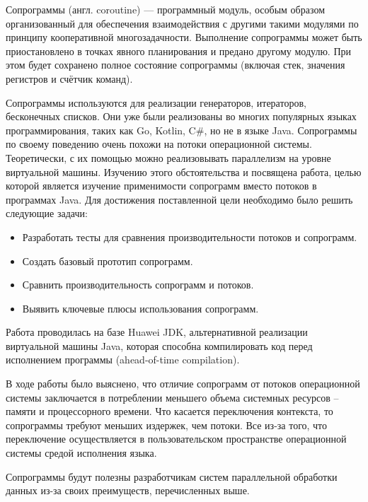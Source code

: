 
Сопрограммы (англ. coroutine) — программный модуль, особым образом организованный для
обеспечения взаимодействия с другими такими модулями по принципу кооперативной
многозадачности. Выполнение сопрограммы может быть
приостановлено в точках явного планирования и предано другому модулю. 
При этом будет сохранено полное состояние сопрограммы (включая стек, значения регистров и счётчик команд). 

\par
Сопрограммы используются для реализации генераторов, итераторов, бесконечных списков. 
Они уже были реализованы во многих популярных языках программирования, таких как Go, Kotlin,
C\#, но не в языке Java. Сопрограммы по своему поведению очень похожи на потоки
операционной системы.
Теоретически, с их помощью можно реализовывать параллелизм на уровне виртуальной машины.
Изучению этого обстоятельства и посвящена работа, целью которой является изучение
применимости сопрограмм вместо потоков в программах Java.
Для достижения поставленной цели необходимо было решить следующие задачи:
\begin{itemize}
	\item Разработать тесты для сравнения производительности потоков и сопрограмм.
	\item Создать базовый прототип сопрограмм.
	\item Сравнить производительность сопрограмм и потоков.
	\item Выявить ключевые плюсы использования сопрограмм.
\end{itemize}
Работа проводилась на базе Huawei JDK, альтернативной реализации виртуальной машины Java, которая способна компилировать код перед исполнением программы (ahead-of-time compilation). 
\par
В ходе работы было выяснено, что отличие сопрограмм от потоков операционной системы
заключается в потреблении меньшего объема системных ресурсов – памяти и процессорного времени.
Что касается переключения контекста, то сопрограммы требуют меньших издержек, чем
потоки. Все из-за того, что переключение осуществляется в пользовательском пространстве
операционной системы средой исполнения языка. 
\par
Сопрограммы будут полезны разработчикам систем параллельной обработки данных из-за своих преимуществ, перечисленных выше.
\clearpage

